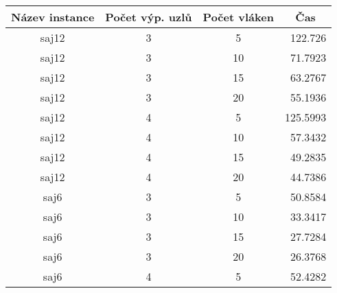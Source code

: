 \documentclass{article} \oddsidemargin=-5mm
\begin{document}
\begin{table}[h]
\centering
\begin{tabular}{|c|c|c|r|}
\hline
\rowcolor[HTML]{C0C0C0} 
\textbf{Název instance} & \textbf{Počet výp. uzlů} & \textbf{Počet vláken} & \multicolumn{1}{c|}{\cellcolor[HTML]{C0C0C0}\textbf{Čas}} \\ \hline
saj12                   & 3                        & 5                     & 122.726                                                   \\ \hline
saj12                   & 3                        & 10                    & 71.7923                                                   \\ \hline
saj12                   & 3                        & 15                    & 63.2767                                                   \\ \hline
saj12                   & 3                        & 20                    & 55.1936                                                   \\ \hline
saj12                   & 4                        & 5                     & 125.5993                                                  \\ \hline
saj12                   & 4                        & 10                    & 57.3432                                                   \\ \hline
saj12                   & 4                        & 15                    & 49.2835                                                   \\ \hline
saj12                   & 4                        & 20                    & 44.7386                                                   \\ \hline
saj6                    & 3                        & 5                     & 50.8584                                                   \\ \hline
saj6                    & 3                        & 10                    & 33.3417                                                   \\ \hline
saj6                    & 3                        & 15                    & 27.7284                                                   \\ \hline
saj6                    & 3                        & 20                    & 26.3768                                                   \\ \hline
saj6                    & 4                        & 5                     & 52.4282                                                   \\ \hline

\end{tabular}
\end{table}
\end{document}
